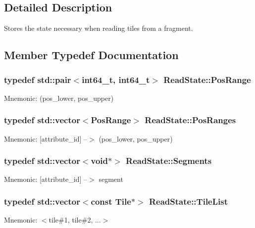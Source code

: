 \subsection{Detailed Description}
Stores the state necessary when reading tiles from a fragment. 

\subsection{Member Typedef Documentation}
\hypertarget{classReadState_a63b506f0fede5c4a26c6bf4d744ce0bc}{}
\subsubsection[{Pos\+Range}]{\setlength{\rightskip}{0pt plus 5cm}typedef std\+::pair$<$int64\+\_\+t, int64\+\_\+t$>$ {\bf Read\+State\+::\+Pos\+Range}}\label{classReadState_a63b506f0fede5c4a26c6bf4d744ce0bc}
Mnemonic\+: (pos\+\_\+lower, pos\+\_\+upper) \hypertarget{classReadState_a83c1f880e2c8bf77f3aa57262bb31043}{}
\subsubsection[{Pos\+Ranges}]{\setlength{\rightskip}{0pt plus 5cm}typedef std\+::vector$<${\bf Pos\+Range}$>$ {\bf Read\+State\+::\+Pos\+Ranges}}\label{classReadState_a83c1f880e2c8bf77f3aa57262bb31043}
Mnemonic\+: \mbox{[}attribute\+\_\+id\mbox{]} --$>$ (pos\+\_\+lower, pos\+\_\+upper) \hypertarget{classReadState_a0c5d7b8fb9e545e2f1801f9acdedd45e}{}
\subsubsection[{Segments}]{\setlength{\rightskip}{0pt plus 5cm}typedef std\+::vector$<$void$\ast$$>$ {\bf Read\+State\+::\+Segments}}\label{classReadState_a0c5d7b8fb9e545e2f1801f9acdedd45e}
Mnemonic\+: \mbox{[}attribute\+\_\+id\mbox{]} --$>$ segment \hypertarget{classReadState_aa1737c390080a8ba377a4ed43f19a569}{}
\subsubsection[{Tile\+List}]{\setlength{\rightskip}{0pt plus 5cm}typedef std\+::vector$<$const {\bf Tile}$\ast$$>$ {\bf Read\+State\+::\+Tile\+List}}\label{classReadState_aa1737c390080a8ba377a4ed43f19a569}
Mnemonic\+: $<$tile\#1, tile\#2, ...$>$ \hypertarget{classReadState_a622db54fa71351c2c36d4a1dcd872225}{}

